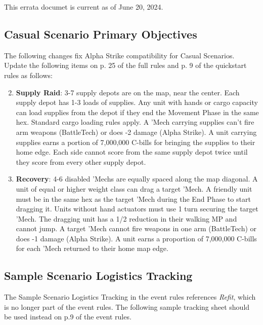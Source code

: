 This errata documet is current as of June 20, 2024.

\subsection{Casual Scenario Primary Objectives}

The following changes fix Alpha Strike compatibility for Casual Scenarios.
Update the following items on p. 25 of the full rules and p. 9 of the quickstart rules  as follows:

\begin{enumerate}

\setcounter{enumi}{1}
\item {\bfseries Supply Raid}: 3-7 supply depots are on the map, near the center.
Each supply depot has 1-3 loads of supplies.
Any unit with hands or cargo capacity can load supplies from the depot if they end the Movement Phase in the same hex.
Standard cargo loading rules apply.
A 'Mech carrying supplies can't fire arm weapons (BattleTech) or does -2 damage (Alpha Strike).
A unit carrying supplies earns a portion of 7,000,000 C-bills for bringing the supplies to their home edge.
Each side cannot score from the same supply depot twice until they score from every other supply depot.

\setcounter{enumi}{7}
\item {\bfseries Recovery}: 4-6 disabled 'Mechs are equally spaced along the map diagonal.
A unit of equal or higher weight class can drag a target 'Mech.
A friendly unit must be in the same hex as the target 'Mech during the End Phase to start dragging it.
Units without hand actuators must use 1 turn securing the target 'Mech.
The dragging unit has a 1/2 reduction in their walking MP and cannot jump.
A target 'Mech cannot fire weapons in one arm (BattleTech) or does -1 damage (Alpha Strike).
A unit earns a proportion of 7,000,000 C-bills for each 'Mech returned to their home map edge.

\end{enumerate}

\subsection{Sample Scenario Logistics Tracking}

The Sample Scenario Logistics Tracking in the event rules references \emph{Refit}, which is no longer part of the event rules.
The following sample tracking sheet should be used instead on p.9 of the event rules.


